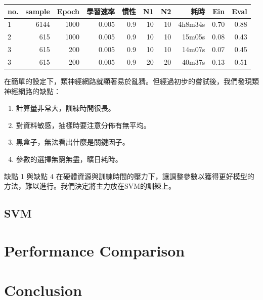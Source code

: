 \begin{table}[htb]
\centering
\begin{threeparttable}
    \begin{tabular}{lrrrrrrrrr}
        \toprule
        no.&   sample&   Epoch&    學習速率&    慣性&   N1&   N2&       耗時&   Ein&  Eval\\
        \midrule
        1&     6144&    1000&   0.005&   0.9&   10&   10&   4h8m34s&   0.70&   0.88\\
        2&      615&    1000&   0.005&   0.9&   10&   10&    15m05s&   0.08&   0.43\\
        3&      615&     200&   0.005&   0.9&   10&   10&    14m07s&   0.07&   0.45\\
        3&      615&     200&   0.005&   0.9&   20&   20&    40m37s&   0.13&   0.51\\
        \bottomrule
    \end{tabular}
\end{threeparttable}
\end{table}

在簡單的設定下，類神經網路就顯著易於亂猜。但經過初步的嘗試後，我們發現類神經網路的缺點：
\begin{enumerate}[itemsep=-1ex, topsep=0ex]
\item 計算量非常大，訓練時間很長。
\item 對資料敏感，抽樣時要注意分佈有無平均。
\item 黑盒子，無法看出什麼是關鍵因子。
\item 參數的選擇無窮無盡，曠日耗時。
\end{enumerate}
缺點 1 與缺點 4 在硬體資源與訓練時間的壓力下，讓調整參數以獲得更好模型的方法，難以進行。我們決定將主力放在SVM的訓練上。

\subsection*{SVM}


\section{Performance Comparison}

\section{Conclusion}


